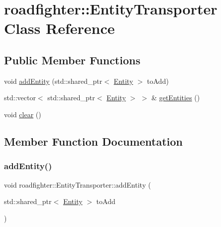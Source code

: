 \hypertarget{classroadfighter_1_1EntityTransporter}{}\section{roadfighter\+:\+:Entity\+Transporter Class Reference}
\label{classroadfighter_1_1EntityTransporter}
\subsection*{Public Member Functions}
\begin{DoxyCompactItemize}
\item 
void \hyperlink{classroadfighter_1_1EntityTransporter_ac5f01c9a0b33b25f29864bd00acf0611}{add\+Entity} (std\+::shared\+\_\+ptr$<$ \hyperlink{classroadfighter_1_1Entity}{Entity} $>$ to\+Add)
\item 
std\+::vector$<$ std\+::shared\+\_\+ptr$<$ \hyperlink{classroadfighter_1_1Entity}{Entity} $>$ $>$ \& \hyperlink{classroadfighter_1_1EntityTransporter_ac19204b4b7104561957b3a741fd6ceb5}{get\+Entities} ()
\item 
void \hyperlink{classroadfighter_1_1EntityTransporter_ac0e443566db9213272103952eb697d92}{clear} ()
\end{DoxyCompactItemize}


\subsection{Member Function Documentation}
\mbox{\label{classroadfighter_1_1EntityTransporter_ac5f01c9a0b33b25f29864bd00acf0611}} 
\subsubsection{\texorpdfstring{add\+Entity()}{addEntity()}}
{\footnotesize\ttfamily void roadfighter\+::\+Entity\+Transporter\+::add\+Entity (\begin{DoxyParamCaption}\item[{std\+::shared\+\_\+ptr$<$ \hyperlink{classroadfighter_1_1Entity}{Entity} $>$}]{to\+Add }\end{DoxyParamCaption})}

